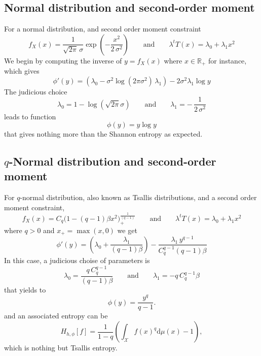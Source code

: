 \documentclass[english,onecolumn]{elsarticle}
\def\dmu{\mathrm{d}\mu}
\def\Rset{\mathbb{R}}
\def\X{\mathcal{X}}
\begin{document}
\subsection{Normal distribution and second-order moment}

For a normal distribution, and second order moment constraint
%
\[
f_X(x) = \frac{1}{\sqrt{2 \pi} \, \sigma} \exp\left( - \frac{x^2}{2 \, \sigma^2}
\right) \qquad \mbox{and} \qquad \lambda^t T(x) = \lambda_0 + \lambda_1 x^2
\]
%
We begin  by computing the  inverse of  $y = f_X(x)$  where $x \in  \Rset_+$ for
instance,  which   gives
%
\[
\phi'(y) = \left( \lambda_0 - \sigma^2 \log(2 \pi \sigma^2) \, \lambda_1 \right)
- 2 \sigma^2 \lambda_1 \log y
\]
%
The judicious choice
%
\[
\lambda_0 = 1 - \log(\sqrt{2 \pi} \sigma) \qquad \mbox{and} \qquad \lambda_1 = -
\, \frac{1}{2 \, \sigma^2}
\]
%
leads to function
%
\[
\phi(y) = y \log y
\]
%
that gives nothing more than the Shannon entropy as expected.


\subsection{$q$-Normal distribution and second-order moment}

For $q$-normal distribution,  also known as Tsallis distributions,  and a second
order moment constraint,
%
\[
f_X(x) = C_q \Big( 1 - (q-1) \beta x^2 \Big)_{\!+}^{\frac{1}{(q-1)}} \qquad
\mbox{and} \qquad \lambda^t T(x) = \lambda_0 + \lambda_1 x^2
\]
%
where $q > 0$ and $x_+ = \max(x,0)$ we get
%
\[
\phi'(y) = \left( \lambda_0 + \frac{\lambda_1}{(q-1) \beta} \right) -
\frac{\lambda_1 \, y^{q-1}}{C_q^{q-1} (q-1) \beta}
\]
%
In this case, a judicious choise of parameters is
%
\[
\lambda_0 = \frac{q \, C_q^{q-1}}{(q-1) \beta} \qquad \mbox{and} \qquad \lambda_1 =
- q \, C_q^{q-1} \beta
\]
%
that yields to
\[
\phi(y) = \frac{y^q}{q-1}.
\]
%
and an associated entropy can be 
\[
H_{h,\phi}[f]=\frac{1}{1-q}\left(\int_{\X} f(x)^q \dmu(x) - 1 \right),
\]
%
which is nothing but Tsallis entropy.

\end{document}
